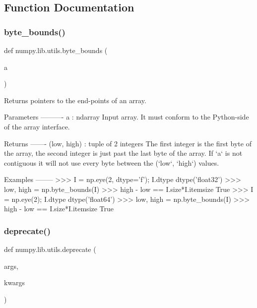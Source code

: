 \subsection{Function Documentation}
\mbox{\label{namespacenumpy_1_1lib_1_1utils_a2f515d59bad0ace5083748a31b82155f}} 
\subsubsection{\texorpdfstring{byte\+\_\+bounds()}{byte\_bounds()}}
{\footnotesize\ttfamily def numpy.\+lib.\+utils.\+byte\+\_\+bounds (\begin{DoxyParamCaption}\item[{}]{a }\end{DoxyParamCaption})}

\begin{DoxyVerb}Returns pointers to the end-points of an array.

Parameters
----------
a : ndarray
    Input array. It must conform to the Python-side of the array
    interface.

Returns
-------
(low, high) : tuple of 2 integers
    The first integer is the first byte of the array, the second
    integer is just past the last byte of the array.  If `a` is not
    contiguous it will not use every byte between the (`low`, `high`)
    values.

Examples
--------
>>> I = np.eye(2, dtype='f'); I.dtype
dtype('float32')
>>> low, high = np.byte_bounds(I)
>>> high - low == I.size*I.itemsize
True
>>> I = np.eye(2); I.dtype
dtype('float64')
>>> low, high = np.byte_bounds(I)
>>> high - low == I.size*I.itemsize
True\end{DoxyVerb}
 \mbox{\label{namespacenumpy_1_1lib_1_1utils_a8ae7926cae438885f67fcbe036308672}} 
\subsubsection{\texorpdfstring{deprecate()}{deprecate()}}
{\footnotesize\ttfamily def numpy.\+lib.\+utils.\+deprecate (\begin{DoxyParamCaption}\item[{}]{args,  }\item[{}]{kwargs }\end{DoxyParamCaption})}

